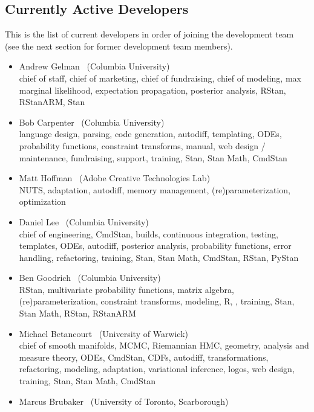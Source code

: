 \subsection*{Currently Active Developers}

This is the list of current developers in order of joining the
development team (see the next section for former development team
members).

\begin{itemize}
\item Andrew Gelman \ (Columbia University)
\\ {\footnotesize chief of staff, chief of marketing, chief of
  fundraising, chief of modeling, max marginal likelihood,
  expectation propagation,  posterior analysis, RStan, RStanARM, Stan}
\item Bob Carpenter \ (Columbia University) \\ {\footnotesize language
    design, parsing, code generation, autodiff, templating, ODEs,
    probability functions, constraint transforms, manual, web design /
    maintenance, fundraising, support, training, Stan, Stan
    Math, CmdStan}
\item Matt Hoffman \ (Adobe Creative Technologies Lab)
\\ {\footnotesize NUTS, adaptation, autodiff, memory management,
  (re)parameterization, optimization \Cpp}
\item Daniel Lee \   (Columbia University)
\\ {\footnotesize chief of engineering, CmdStan, builds, continuous
  integration, testing, templates, ODEs, autodiff,
  posterior analysis, probability functions, error handling,
  refactoring, training, Stan, Stan Math, CmdStan, RStan, PyStan}
\item Ben Goodrich \   (Columbia University)
\\ {\footnotesize RStan, multivariate probability functions, matrix algebra,
  (re)parameterization, constraint transforms, modeling, R, \Cpp,
  training, Stan, Stan Math,  RStan, RStanARM}
\item Michael Betancourt \ (University of Warwick) \\
  {\footnotesize chief of smooth manifolds, MCMC, Riemannian HMC,
    geometry, analysis and measure theory, ODEs, CmdStan, CDFs,
    autodiff, transformations, refactoring, modeling, adaptation, variational
    inference, logos, web design, training, Stan, Stan Math, CmdStan}
\item Marcus Brubaker \   (University of Toronto, Scarborough)

\end{itemize}
